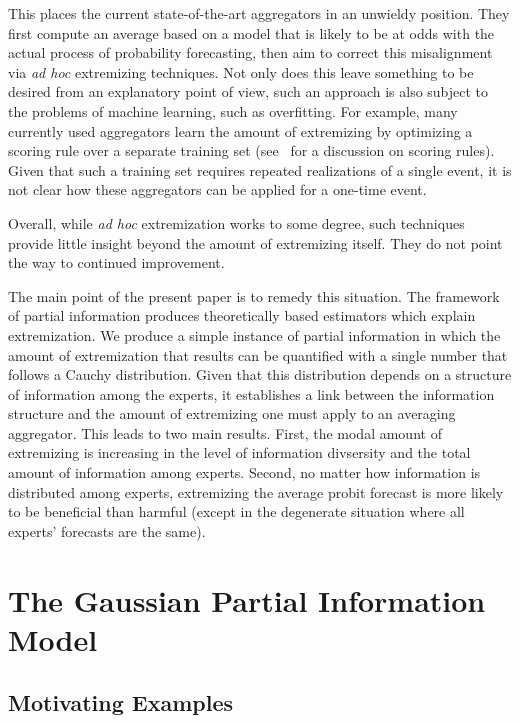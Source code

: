 \documentclass[11pt]{article}
\theoremstyle{definition}
\theoremstyle{definition}
\begin{document}
This places the current state-of-the-art aggregators in an unwieldy
position.  They first compute an average based on a model that
is likely to be at odds with the actual process of probability
forecasting, then aim to correct this misalignment via {\em ad hoc} 
extremizing techniques.  
%
Not only does this leave something to be desired from an explanatory 
point of view, such an approach is also subject to the problems of 
machine learning, such as overfitting.  For example, many currently
used aggregators learn the amount of extremizing by optimizing a scoring
rule over a separate training set (see~\citealt{Gneiting04strictlyproper} 
for a discussion on scoring rules).
Given that such a training set requires repeated realizations of
a single event, it is not clear how these aggregators can be applied
for a one-time event.  

Overall, while {\em ad hoc} extremization works to some degree, such
techniques provide little insight beyond the amount of extremizing
itself.  They do not point the way to continued improvement.

The main point of the present paper is to remedy this situation.
The framework of partial information produces theoretically
based estimators which explain extremization.  We produce a 
simple instance of partial information in which the amount of 
extremization that results can be quantified with a single number
that follows a Cauchy distribution.  Given that this distribution
depends on a structure of information among the experts, it establishes
a link between the information structure and the amount of
extremizing one must apply to an averaging aggregator.  This leads
to two main results.  First, the modal amount of extremizing is 
increasing in the level of information divsersity and the total amount 
of information among experts.  Second, no matter how information is 
distributed among experts, extremizing the average probit forecast
is more likely to be beneficial than harmful (except in the degenerate
situation where all experts' forecasts are the same).


\section{The Gaussian Partial Information Model}
\label{sec:model}

\subsection{Motivating Examples}
\end{document}
